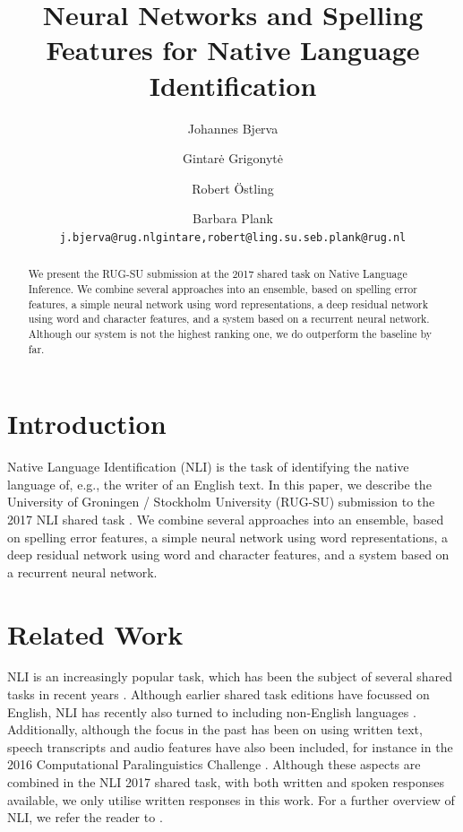 \documentclass[11pt,letterpaper]{article}
\title{Neural Networks and Spelling Features for Native Language Identification}
\author{Johannes Bjerva \and Gintar\.e Grigonyt\.e \and Robert {\"O}stling \and Barbara Plank \\
{\tt j.bjerva@rug.nl\hfill{gintare,robert}@ling.su.se\hfill b.plank@rug.nl}}
\date{}
\begin{document}
\maketitle

\begin{abstract}
    We present the RUG-SU submission at the 2017 shared task on Native
    Language Inference.
    We combine several approaches into an ensemble, based on spelling error features, a simple neural network using word representations, a deep residual network using word and character features, and a system based on a recurrent neural network.
    Although our system is not the highest ranking one, we do outperform the baseline by far.
\end{abstract}


\section{Introduction}

Native Language Identification (NLI) is the task of identifying the native language of, e.g., the writer of an English text.
In this paper, we describe the University of Groningen / Stockholm University (RUG-SU) submission to the 2017 NLI shared task \citep{nli2017}.
We combine several approaches into an ensemble, based on spelling error features, a simple neural network using word representations, a deep residual network using word and character features, and a system based on a recurrent neural network.

\section{Related Work}

NLI is an increasingly popular task, which has been the subject of several shared tasks in recent years \citep{nli2013,compare2016,nli2017}.
Although earlier shared task editions have focussed on English, NLI has recently also turned to including non-English languages \citep{multilingual-nli}.
Additionally, although the focus in the past has been on using written text, speech transcripts and audio features have also been included, for instance in the 2016 Computational Paralinguistics Challenge \citep{compare2016}.
Although these aspects are combined in the NLI 2017 shared task, with both written and spoken responses available, we only utilise written responses in this work.
For a further overview of NLI, we refer the reader to \citet{malmasi2016}.
\end{document}
